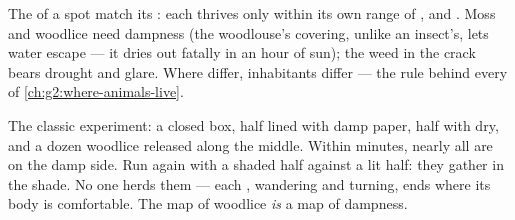 \begin{proposition}\label{prop:g6:exploring-our-environment:decide}
The  of a spot match its : each 
thrives only within its own range of ,  and
. Moss and woodlice need dampness (the woodlouse's
covering, unlike an insect's, lets water escape --- it dries
out fatally in an hour of sun); the weed in the crack bears
drought and glare. Where  differ, inhabitants
differ --- the rule behind every  of
\cref{ch:g2:where-animals-live}.
\end{proposition}
\admitted

\begin{example}\label{ex:g6:exploring-our-environment:chooser}
The classic experiment: a closed box, half lined with damp
paper, half with dry, and a dozen woodlice released along the
middle. Within minutes, nearly all are on the damp side. Run
again with a shaded half against a lit half: they gather in
the shade. No one herds them --- each , wandering and
turning, ends where its body is comfortable. The map of
woodlice \emph{is} a map of dampness.
\end{example}

